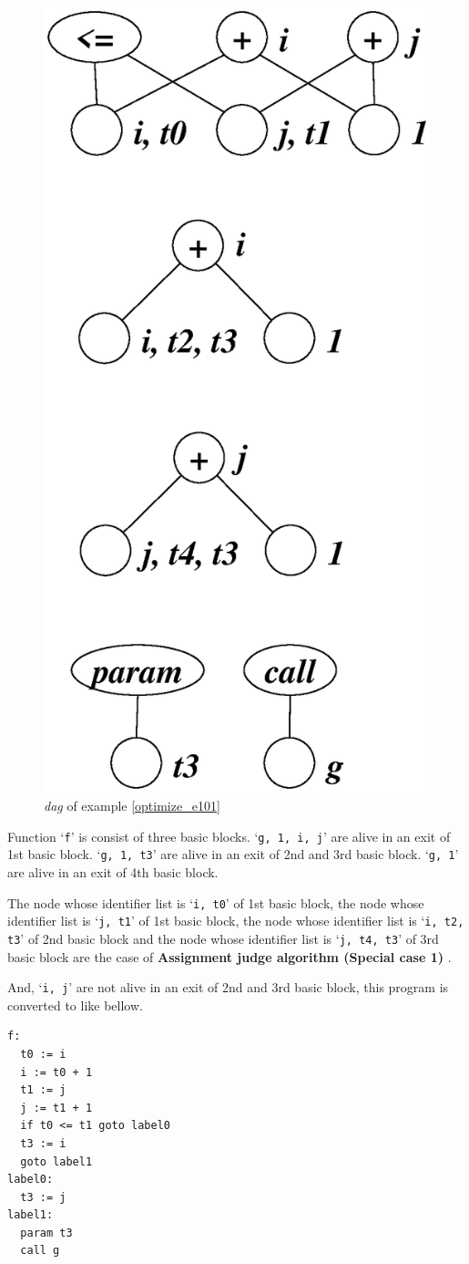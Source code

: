 \begin{Example}
\begin{figure}[htbp]
\begin{center}
\begin{latexonly}
\includegraphics[width=0.556\linewidth,height=1.1\linewidth]{opt044.eps}
\end{latexonly}
\caption{{\em dag} of example \ref{optimize_e101}}
\label{optimize_e102}
\end{center}
\end{figure}
Function `{\tt{f}}' is consist of three basic blocks.
`{\tt{g, 1, i, j}}' are
alive in an exit of 1st basic block.
`{\tt{g, 1, t3}}' are
alive in an exit of 2nd and 3rd basic block.
`{\tt{g, 1}}' are
alive in an exit of 4th basic block.

The node whose identifier list is `{\tt{i, t0}}' of 1st basic block,
the node whose identifier list is `{\tt{j, t1}}' of 1st basic block,
the node whose identifier list is `{\tt{i, t2, t3}}' of 2nd basic block
and the node whose identifier list is `{\tt{j, t4, t3}}' of 3rd basic block
are the case of {\bf Assignment judge algorithm (Special case 1) }.

And, `{\tt{i, j}}' are not alive in an exit of 2nd and 3rd basic block,
this program is converted to like bellow.
\begin{verbatim}
f:
  t0 := i
  i := t0 + 1
  t1 := j
  j := t1 + 1
  if t0 <= t1 goto label0
  t3 := i
  goto label1
label0:
  t3 := j
label1:
  param t3
  call g
\end{verbatim}
\end{Example}

